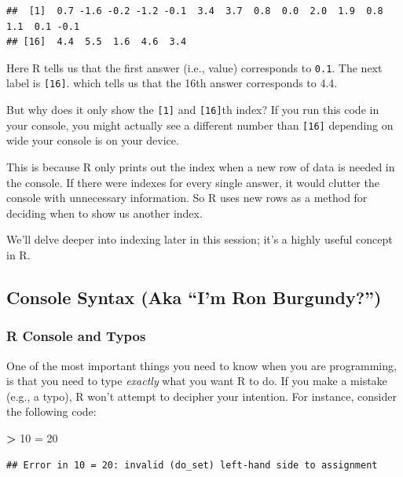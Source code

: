 \documentclass[
]{book}
\newenvironment{Shaded}{\begin{snugshade}}{\end{snugshade}}
\newcommand{\DecValTok}[1]{\textcolor[rgb]{0.00,0.00,0.81}{#1}}
\newcommand{\OtherTok}[1]{\textcolor[rgb]{0.56,0.35,0.01}{#1}}
\newcommand{\SpecialCharTok}[1]{\textcolor[rgb]{0.81,0.36,0.00}{\textbf{#1}}}
\begin{document}
\begin{verbatim}
##  [1]  0.7 -1.6 -0.2 -1.2 -0.1  3.4  3.7  0.8  0.0  2.0  1.9  0.8  1.1  0.1 -0.1
## [16]  4.4  5.5  1.6  4.6  3.4
\end{verbatim}

Here R tells us that the first answer (i.e., value) corresponds to \texttt{0.1}. The next label is \texttt{{[}16{]}}. which tells us that the 16th answer corresponds to 4.4.

But why does it only show the \texttt{{[}1{]}} and \texttt{{[}16{]}}th index? If you run this code in your console, you might actually see a different number than \texttt{{[}16{]}} depending on wide your console is on your device.

This is because R only prints out the index when a new row of data is needed in the console. If there were indexes for every single answer, it would clutter the console with unnecessary information. So R uses new rows as a method for deciding when to show us another index.

We'll delve deeper into indexing later in this session; it's a highly useful concept in R.

\hypertarget{console-syntax-aka-im-ron-burgundy}{%
\subsection{Console Syntax (Aka ``I'm Ron Burgundy?'')}\label{console-syntax-aka-im-ron-burgundy}}

\hypertarget{r-console-and-typos}{%
\subsubsection{R Console and Typos}\label{r-console-and-typos}}

One of the most important things you need to know when you are programming, is that you need to type \emph{exactly} what you want R to do. If you make a mistake (e.g., a typo), R won't attempt to decipher your intention. For instance, consider the following code:

\begin{Shaded}
\begin{Highlighting}[]
\SpecialCharTok{\textgreater{}} \DecValTok{10} \OtherTok{=} \DecValTok{20}
\end{Highlighting}
\end{Shaded}

\begin{verbatim}
## Error in 10 = 20: invalid (do_set) left-hand side to assignment
\end{verbatim}
\end{document}
